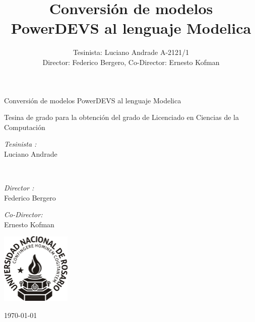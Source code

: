 \documentclass[a4paper,	11pt]{report}
\begin{document}
\renewcommand\floatpagefraction{.9}
\renewcommand\topfraction{.9}
\renewcommand\bottomfraction{.9}
\renewcommand\textfraction{.1}
\setcounter{totalnumber}{50}
\setcounter{topnumber}{50}
\setcounter{bottomnumber}{50}
\newcommand{\quotes}[1]{``#1''}

\title{Conversión de modelos PowerDEVS al lenguaje Modelica}
\author{Tesinista: Luciano Andrade A-2121/1\\ Director: Federico Bergero, Co-Director: Ernesto Kofman} 


\begin{titlepage}
\begin{center}

\huge Conversión de modelos PowerDEVS al lenguaje Modelica

\vfill

Tesina de grado para la obtención del grado de Licenciado en Ciencias de la Computación

\begin{minipage}[t]{0.4\textwidth}
\begin{flushleft} \large
\emph{Tesinista :}\\
Luciano Andrade
\end{flushleft}
\end{minipage}\\ 
\vfill
\begin{minipage}[t]{0.4\textwidth}
\begin{flushleft} \large
\emph{Director :}\\
Federico Bergero
\end{flushleft}
\end{minipage}%
\begin{minipage}[t]{0.4\textwidth}
\begin{flushright} \large
\emph{Co-Director:} \\
Ernesto Kofman 
\end{flushright}
\end{minipage}

\vfill

\includegraphics[width=0.25\textwidth]{logo-unr}

\vfill

{\large \today}
\end{center}
\end{titlepage}
\end{document}

